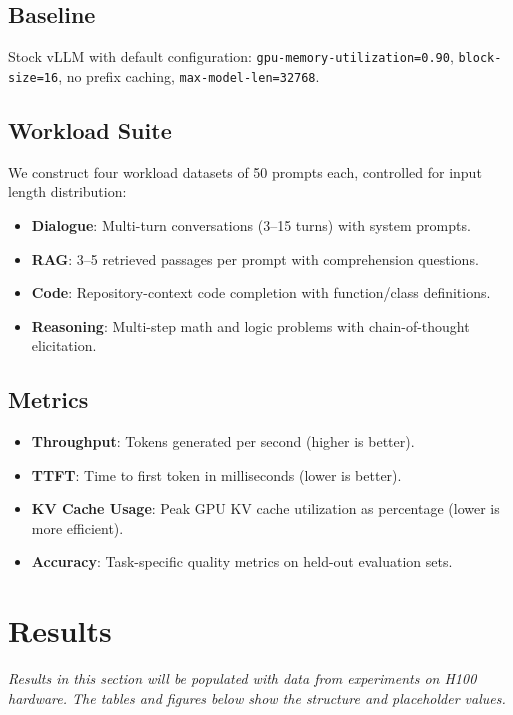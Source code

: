 \documentclass[conference]{IEEEtran}
\begin{document}
\subsection{Baseline}
Stock vLLM with default configuration: \texttt{gpu-memory-utilization=0.90}, \texttt{block-size=16}, no prefix caching, \texttt{max-model-len=32768}.

\subsection{Workload Suite}
We construct four workload datasets of 50 prompts each, controlled for input length distribution:
\begin{itemize}
\item \textbf{Dialogue}: Multi-turn conversations (3--15 turns) with system prompts.
\item \textbf{RAG}: 3--5 retrieved passages per prompt with comprehension questions.
\item \textbf{Code}: Repository-context code completion with function/class definitions.
\item \textbf{Reasoning}: Multi-step math and logic problems with chain-of-thought elicitation.
\end{itemize}

\subsection{Metrics}
\begin{itemize}
\item \textbf{Throughput}: Tokens generated per second (higher is better).
\item \textbf{TTFT}: Time to first token in milliseconds (lower is better).
\item \textbf{KV Cache Usage}: Peak GPU KV cache utilization as percentage (lower is more efficient).
\item \textbf{Accuracy}: Task-specific quality metrics on held-out evaluation sets.
\end{itemize}

\section{Results}

\textit{Results in this section will be populated with data from experiments on H100 hardware. The tables and figures below show the structure and placeholder values.}
\end{document}
